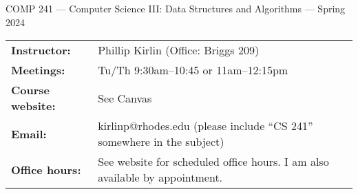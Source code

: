 \documentclass [letterpaper,11pt]{article}
\begin{document}
\begin{center}
\large COMP 241 --- Computer Science III: Data Structures and Algorithms --- Spring 2024
\end{center}

\noindent\begin{tabular}{@{}ll}
\textbf{Instructor:} & Phillip Kirlin (Office: Briggs 209)\\
\textbf{Meetings:} & Tu/Th 9:30am--10:45 or 11am--12:15pm \\
\textbf{Course website:} & See Canvas\\
\textbf{Email:} &kirlinp@rhodes.edu (please include ``CS 241'' somewhere in the subject)\\
\textbf{Office hours:} & See website for scheduled office hours.  I am also available by appointment.\\
\end{tabular}
\end{document}
